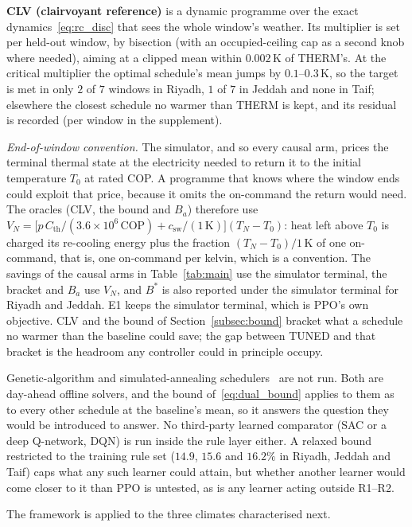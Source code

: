 \documentclass[3p,twocolumn,number]{elsarticle}
\newcommand{\Cth}{C_{\mathrm{th}}}
\newcommand{\csw}{c_{\mathrm{sw}}}
\begin{document}
\textbf{CLV (clairvoyant reference)} is a dynamic programme over the exact dynamics~\eqref{eq:rc_disc} that sees the whole window's weather. Its multiplier is set per held-out window, by bisection (with an occupied-ceiling cap as a second knob where needed), aiming at a clipped mean within $0.002\,$K of THERM's. At the critical multiplier the optimal schedule's mean jumps by $0.1$--$0.3\,$K, so the target is met in only $2$ of $7$ windows in Riyadh, $1$ of $7$ in Jeddah and none in Taif; elsewhere the closest schedule no warmer than THERM is kept, and its residual is recorded (per window in the supplement).

\emph{End-of-window convention.} The simulator, and so every causal arm, prices the terminal thermal state at the electricity needed to return it to the initial temperature $T_0$ at rated COP. A programme that knows where the window ends could exploit that price, because it omits the on-command the return would need. The oracles (CLV, the bound and $B_a$) therefore use $V_N=\bigl[p\,\Cth/(3.6\times10^{6}\,\mathrm{COP})+\csw/(1\,\mathrm{K})\bigr](T_N-T_0)$: heat left above $T_0$ is charged its re-cooling energy plus the fraction $(T_N-T_0)/1\,$K of one on-command, that is, one on-command per kelvin, which is a convention. The savings of the causal arms in Table~\ref{tab:main} use the simulator terminal, the bracket and $B_a$ use $V_N$, and $B^\ast$ is also reported under the simulator terminal for Riyadh and Jeddah. E1 keeps the simulator terminal, which is PPO's own objective. CLV and the bound of Section~\ref{subsec:bound} bracket what a schedule no warmer than the baseline could save; the gap between TUNED and that bracket is the headroom any controller could in principle occupy.

Genetic-algorithm and simulated-annealing schedulers~\cite{ElMakroum2023,Bandarra2025} are not run. Both are day-ahead offline solvers, and the bound of~\eqref{eq:dual_bound} applies to them as to every other schedule at the baseline's mean, so it answers the question they would be introduced to answer. No third-party learned comparator (SAC or a deep Q-network, DQN) is run inside the rule layer either. A relaxed bound restricted to the training rule set ($14.9$, $15.6$ and $16.2\%$ in Riyadh, Jeddah and Taif) caps what any such learner could attain, but whether another learner would come closer to it than PPO is untested, as is any learner acting outside R1--R2.
 
The framework is applied to the three climates characterised next.
 
\end{document}
